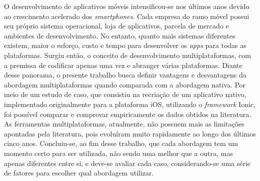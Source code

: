 \begin{resumo}
\begin{comment}
 O resumo deve ressaltar o objetivo, o método, os resultados e as conclusões 
 do documento. A ordem e a extensão
 destes itens dependem do tipo de resumo (informativo ou indicativo) e do
 tratamento que cada item recebe no documento original. O resumo deve ser
 precedido da referência do documento, com exceção do resumo inserido no
 próprio documento. (\ldots) As palavras-chave devem figurar logo abaixo do
 resumo, antecedidas da expressão Palavras-chave:, separadas entre si por
 ponto e finalizadas também por ponto. O texto pode conter no mínimo 150 e 
 no máximo 500 palavras, é aconselhável que sejam utilizadas 200 palavras. 
 E não se separa o texto do resumo em parágrafos.

 O desenvolvimento de aplicativos móveis cresceu muito nos últimos anos
 devido ao crescimento acelerado dos \textit{smartphones}. Com isso, surgiram 
 lojas de aplicativos, ambientes e \textit{SDKs} diferentes para 
 cada sistema operacional móvel. No entanto, quanto mais sistemas diferentes 
 existem, maior o esforço para desenvolver os \textit{apps} para todas 
 as plataformas. Com essa gama de plataformas diferentes, invariavelmente,
 o desenvolvedor precisará escolher qual plataforma irá seguir. Surge, então, uma forma 
 de desenvolvimento com a premissa de resolver 
 o problema da criação de um \textit{apps} para cada plataforma. 
 Essa solução ficou conhecida como desenvolvimento multiplataformas e possui
 vantagens e desvantagens em relação ao desenvolvimento nativo. Será feita uma
 pesquisa e um estudo de caso para avaliar essas vantagens e desvantagens de 
 maneira empírica e assim definir uma forma de escolher qual abordagem deve ser 
 adotada em cada caso específico.
\end{comment}

 O desenvolvimento de aplicativos móveis intensificou-se nos últimos anos devido ao crescimento acelerado dos \textit{smartphones}. Cada empresa
 do ramo móvel possui seu próprio sistema operacional, loja de aplicativos, parcela de mercado e ambientes de desenvolvimento. No entanto, quanto mais 
 sistemas diferentes existem, maior o esforço, custo e tempo para desenvolver os \textit{apps} para todas as plataformas. Surgiu então, o conceito de desenvolvimento multiplataformas,
 com a premissa de codificar apenas uma vez e abranger várias plataformas. Diante desse panorama, o presente trabalho busca definir vantagens e desvantagens da abordagem
 multiplataformas quando comparada com a abordagem nativa. Por meio de um estudo de caso, que consistiu na recriação de um aplicativo nativo, implementado originalmente para a plataforma iOS,
 utilizando o \textit{framework} Ionic, foi possível comparar e comprovar empiricamente os dados obtidos na literatura. As ferramentas multiplataformas, atualmente,
 não possuem mais as limitações apontadas pela literatura, pois evoluíram muito rapidamente ao longo dos últimos cinco anos. Concluiu-se, ao fim desse trabalho, que cada abordagem tem um momento certo
 para ser utilizada, não sendo uma melhor que a outra, mas apenas diferentes entre si, e deve-se avaliar cada caso, considerando-se uma série de fatores para escolher qual abordagem utilizar.


\end{resumo}
